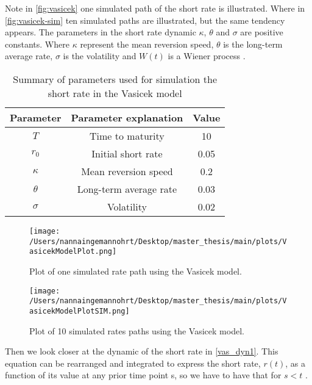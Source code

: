  Note in \autoref{fig:vasicek}
one simulated path of the short rate is illustrated. Where in \autoref{fig:vasicek-sim} ten simulated paths are illustrated,
but the same tendency appears. The parameters in the short rate dynamic
$\kappa$, $\theta$ and $\sigma$ are positive constants. Where $\kappa$ represent the mean reversion speed, $\theta$ 
is the long-term average rate, $\sigma$ is the volatility  and $W(t)$ is a Wiener process \cite{Bermudan}. 
\\
\begin{table}[H]
    \centering
    \begin{tabular}{ccc}
      \toprule
      \textbf{Parameter} & \textbf{Parameter explanation} & \textbf{Value} \\
      \midrule
      \rowcolor{lightgray!40} $T$ & Time to maturity & 10 \\
      $r_0$ & Initial short rate & 0.05 \\
      \rowcolor{lightgray!40} $\kappa$ & Mean reversion speed & 0.2\\
      $\theta$ & Long-term average rate  & 0.03 \\
      \rowcolor{lightgray!40}$\sigma$ & Volatility& 0.02 \\
      \bottomrule
    \end{tabular}
    \caption{Summary of parameters used for simulation the short rate in the Vasicek model}
    \label{tab:parameters_short_rate}
\end{table}
\noindent
\begin{figure}[H]
    \centering
    \texttt{[image: /Users/nannaingemannohrt/Desktop/master\_thesis/main/plots/VasicekModelPlot.png]}
    \caption{Plot of one simulated rate path  using the Vasicek model.}
    \label{fig:vasicek}
\end{figure}
\noindent
\begin{figure}[H]
    \centering
    \texttt{[image: /Users/nannaingemannohrt/Desktop/master\_thesis/main/plots/VasicekModelPlotSIM.png]}
    \caption{Plot of 10 simulated  rates  paths using the Vasicek model.}
    \label{fig:vasicek-sim}
\end{figure}
\noindent
Then we look closer at the dynamic of the short rate in \autoref{vas_dyn1}. This equation can be rearranged and integrated
to express the short rate, $r(t)$, as a function of its value at any prior time point s, 
so we have to have that for $s < t$ \cite{Bermudan}. 
